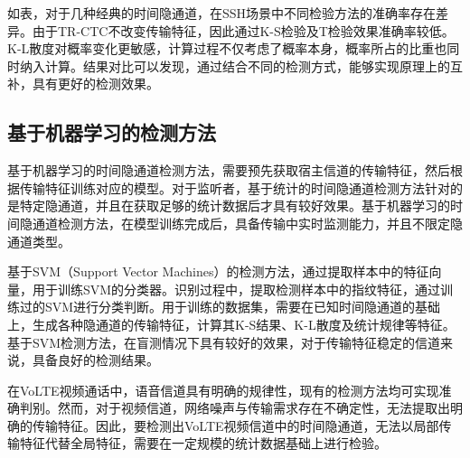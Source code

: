 
如表，对于几种经典的时间隐通道，在SSH场景中不同检验方法的准确率存在差异。由于TR-CTC不改变传输特征，因此通过K-S检验及T检验效果准确率较低。K-L散度对概率变化更敏感，计算过程不仅考虑了概率本身，概率所占的比重也同时纳入计算。结果对比可以发现，通过结合不同的检测方式，能够实现原理上的互补，具有更好的检测效果。

\subsection{基于机器学习的检测方法}
\label{chap:backinfo:detect:machine}

基于机器学习的时间隐通道检测方法，需要预先获取宿主信道的传输特征，然后根据传输特征训练对应的模型。对于监听者，基于统计的时间隐通道检测方法针对的是特定隐通道，并且在获取足够的统计数据后才具有较好效果。基于机器学习的时间隐通道检测方法，在模型训练完成后，具备传输中实时监测能力，并且不限定隐通道类型。

基于SVM（Support Vector Machines）的检测方法，通过提取样本中的特征向量，用于训练SVM的分类器。识别过程中，提取检测样本中的指纹特征，通过训练过的SVM进行分类判断。用于训练的数据集，需要在已知时间隐通道的基础上，生成各种隐通道的传输特征，计算其K-S结果、K-L散度及统计规律等特征。基于SVM检测方法，在盲测情况下具有较好的效果，对于传输特征稳定的信道来说，具备良好的检测结果。

在VoLTE视频通话中，语音信道具有明确的规律性，现有的检测方法均可实现准确判别。然而，对于视频信道，网络噪声与传输需求存在不确定性，无法提取出明确的传输特征。因此，要检测出VoLTE视频信道中的时间隐通道，无法以局部传输特征代替全局特征，需要在一定规模的统计数据基础上进行检验。